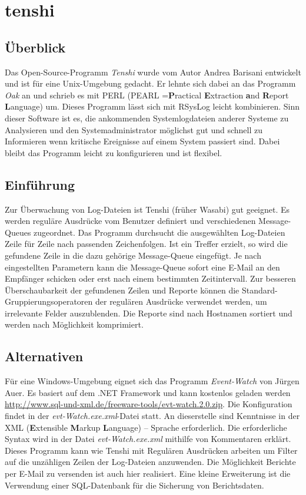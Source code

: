 \section{tenshi}
\subsection{Überblick}
Das Open-Source-Programm \textit{Tenshi} wurde vom Autor Andrea Barisani entwickelt und ist für eine Unix-Umgebung gedacht. Er lehnte sich dabei an das Programm \textit{Oak} an und schrieb es mit PERL (PEARL =\textbf{P}ractical \textbf{E}xtraction \textbf{a}nd \textbf{R}eport \textbf{L}anguage) um. Dieses Programm lässt sich mit RSysLog leicht kombinieren. Sinn dieser Software ist es, die ankommenden Systemlogdateien anderer Systeme zu Analysieren und den Systemadministrator möglichst gut und schnell zu Informieren wenn kritische Ereignisse auf einem System passiert sind. Dabei bleibt das Programm leicht zu konfigurieren und ist flexibel.

\subsection{Einführung}
Zur Überwachung von Log-Dateien ist Tenshi (früher Wasabi) gut geeignet. Es werden reguläre Ausdrücke vom Benutzer definiert und verschiedenen Message-Queues zugeordnet. Das Programm durchsucht die ausgewählten Log-Dateien Zeile für Zeile nach passenden Zeichenfolgen. Ist ein Treffer erzielt, so wird die gefundene Zeile in die dazu gehörige Message-Queue eingefügt. Je nach eingestellten Parametern kann die Message-Queue sofort eine E-Mail an den Empfänger schicken oder erst nach einem bestimmten Zeitintervall. 
Zur besseren Überschaubarkeit der gefundenen Zeilen und Reporte können die Standard-Gruppierungsoperatoren der regulären Ausdrücke verwendet werden, um irrelevante Felder auszublenden. 
Die Reporte sind nach Hostnamen sortiert und werden nach Möglichkeit komprimiert. \cite{TenshiDescription}

\subsection{Alternativen}
Für eine Windows-Umgebung  eignet sich das Programm \textit{Event-Watch} von Jürgen Auer. Es basiert auf dem .NET Framework und kann kostenlos geladen werden \url{http://www.sql-und-xml.de/freeware-tools/evt-watch.2.0.zip}. Die Konfiguration findet  in der \textit{evt-Watch.exe.xml}-Datei statt. An dieserstelle sind Kenntnisse in der XML (\textbf{E}xtensible \textbf{M}arkup \textbf{L}anguage) – Sprache erforderlich. Die erforderliche Syntax wird in der Datei \textit{evt-Watch.exe.xml } mithilfe von Kommentaren erklärt. Dieses Programm kann wie Tenshi mit Regulären Ausdrücken arbeiten um Filter auf die unzähligen Zeilen der Log-Dateien anzuwenden. Die Möglichkeit Berichte per E-Mail zu versenden ist auch hier realisiert. Eine kleine Erweiterung ist die Verwendung einer SQL-Datenbank für die Sicherung von Berichtsdaten.

